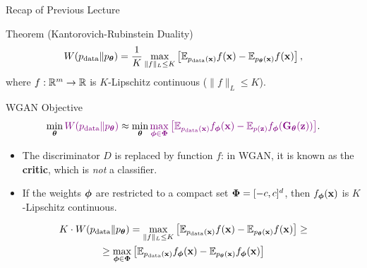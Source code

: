 \documentclass{beamer}
\begin{document}
\begin{frame}{Recap of Previous Lecture}
	\begin{block}{Theorem (Kantorovich-Rubinstein Duality)}
		\vspace{-0.2cm}
		\[
		W(p_{\text{data}} \| p_{\boldsymbol{\theta}}) = \frac{1}{K} \max_{\| f \|_L \leq K} \left[ \mathbb{E}_{p_{\text{data}}(\mathbf{x})} f(\mathbf{x})  - \mathbb{E}_{p_{\boldsymbol{\theta}}(\mathbf{x})} f(\mathbf{x})\right],
		\]
		where $f : \mathbb{R}^m \rightarrow \mathbb{R}$ is $K$-Lipschitz continuous ($\| f \|_L \leq K$).
	\end{block}
	\begin{block}{WGAN Objective}
		\vspace{-0.5cm}
		\[
		\min_{\boldsymbol{\theta}} {\color{violet}W(p_{\text{data}} \| p_{\boldsymbol{\theta}})} \approx \min_{\boldsymbol{\theta}} {\color{violet}\max_{\boldsymbol{\phi} \in \boldsymbol{\Phi}} \left[ \mathbb{E}_{p_{\text{data}}(\mathbf{x})} f_{\boldsymbol{\phi}}(\mathbf{x})  - \mathbb{E}_{p(\mathbf{z})} f_{\boldsymbol{\phi}}(\mathbf{G}_{\boldsymbol{\theta}}(\mathbf{z}))\right]}.
		\]
		\vspace{-0.5cm}
	\end{block}
	\begin{itemize}
		\item The discriminator $D$ is replaced by function $f$: in WGAN, it is known as the \textbf{critic}, which is \emph{not} a classifier.
		\item If the weights $\boldsymbol{\phi}$ are restricted to a compact set $\boldsymbol{\Phi} = [-c, c]^d$, then $f_{\boldsymbol{\phi}}(\mathbf{x})$ is $K$-Lipschitz continuous.
	\end{itemize}
	\vspace{-0.4cm}
	\begin{multline*}
		K \cdot W(p_{\text{data}} \| p_{\boldsymbol{\theta}}) = \max_{\| f \|_L \leq K} \left[ \mathbb{E}_{p_{\text{data}}(\mathbf{x})} f(\mathbf{x}) - \mathbb{E}_{p_{\boldsymbol{\theta}}(\mathbf{x})} f(\mathbf{x})\right] \geq 
		\\ \geq \max_{\boldsymbol{\phi} \in \boldsymbol{\Phi}} \left[ \mathbb{E}_{p_{\text{data}}(\mathbf{x})} f_{\boldsymbol{\phi}}(\mathbf{x})  - \mathbb{E}_{p_{\boldsymbol{\theta}}(\mathbf{x})} f_{\boldsymbol{\phi}}(\mathbf{x})\right]
	\end{multline*}
\end{frame}
\end{document}
